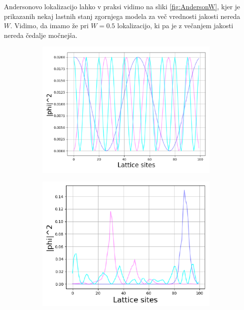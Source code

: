 Andersonovo lokalizacijo lahko v praksi vidimo na sliki \ref{fig:AndersonW}, kjer je prikazanih nekaj lastnih stanj zgornjega modela za več vrednosti jakosti nereda $W$. Vidimo, da imamo že pri $W=0.5$ lokalizacijo, ki pa je z večanjem jakosti nereda čedalje močnejša.
\begin{figure}[H]
\centering
\begin{subfigure}{.33\textwidth}
\includegraphics[width=\linewidth]{Figures/AndersonBloch.pdf}
\end{subfigure}
\begin{subfigure}{.32\textwidth}
\includegraphics[width=\linewidth]{Figures/Anderson05.pdf}
\end{subfigure}
\begin{subfigure}{.33\textwidth}

\end{subfigure}
\end{figure}
